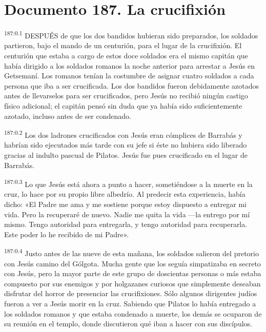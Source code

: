 \chapter{Documento 187. La crucifixión}
\par 
\textsuperscript{187:0.1} DESPUÉS de que los dos bandidos hubieran sido preparados, los soldados partieron, bajo el mando de un centurión, para el lugar de la crucifixión. El centurión que estaba a cargo de estos doce soldados era el mismo capitán que había dirigido a los soldados romanos la noche anterior para arrestar a Jesús en Getsemaní. Los romanos tenían la costumbre de asignar cuatro soldados a cada persona que iba a ser crucificada. Los dos bandidos fueron debidamente azotados antes de llevarselos para ser crucificados, pero Jesús no recibió ningún castigo físico adicional; el capitán pensó sin duda que ya había sido suficientemente azotado, incluso antes de ser condenado.

\par 
\textsuperscript{187:0.2} Los dos ladrones crucificados con Jesús eran cómplices de Barrabás y habrían sido ejecutados más tarde con su jefe si éste no hubiera sido liberado gracias al indulto pascual de Pilatos. Jesús fue pues crucificado en el lugar de Barrabás.

\par 
\textsuperscript{187:0.3} Lo que Jesús está ahora a punto a hacer, sometiéndose a la muerte en la cruz, lo hace por su propio libre albedrío. Al predecir esta experiencia, había dicho: «El Padre me ama y me sostiene porque estoy dispuesto a entregar mi vida. Pero la recuperaré de nuevo. Nadie me quita la vida ---la entrego por mí mismo. Tengo autoridad para entregarla, y tengo autoridad para recuperarla. Este poder lo he recibido de mi Padre».

\par 
\textsuperscript{187:0.4} Justo antes de las nueve de esta mañana, los soldados salieron del pretorio con Jesús camino del Gólgota. Mucha gente que los seguía simpatizaba en secreto con Jesús, pero la mayor parte de este grupo de doscientas personas o más estaba compuesto por sus enemigos y por holgazanes curiosos que simplemente deseaban disfrutar del horror de presenciar las crucifixiones. Sólo algunos dirigentes judíos fueron a ver a Jesús morir en la cruz. Sabiendo que Pilatos lo había entregado a los soldados romanos y que estaba condenado a muerte, los demás se ocuparon de su reunión en el templo, donde discutieron qué iban a hacer con sus discípulos.

